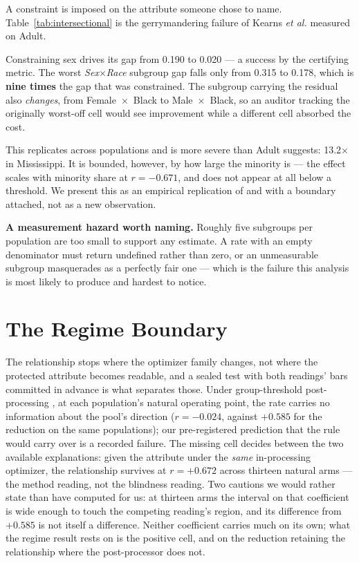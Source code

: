 \documentclass[conference]{IEEEtran}
\begin{document}
A constraint is imposed on the attribute someone chose to name.
Table~\ref{tab:intersectional} is the gerrymandering failure of Kearns \emph{et al.}
\cite{kearns2018} measured on Adult.

Constraining sex drives its gap from 0.190 to 0.020 --- a success by the certifying metric.
The worst \emph{Sex}$\times$\emph{Race} subgroup gap falls only from 0.315 to 0.178, which is
\textbf{nine times} the gap that was constrained. The subgroup carrying the residual also
\emph{changes}, from Female~$\times$~Black to Male~$\times$~Black, so an auditor tracking the
originally worst-off cell would see improvement while a different cell absorbed the cost.

This replicates across populations and is more severe than Adult suggests: 13.2$\times$ in
Mississippi. It is bounded, however, by how large the minority is --- the effect scales with
minority share at $r = -0.671$, and does not appear at all below a threshold. We present this
as an empirical replication of \cite{kearns2018} and \cite{maheshwari2023} with a boundary
attached, not as a new observation.

\textbf{A measurement hazard worth naming.} Roughly five subgroups per population are too small
to support any estimate. A rate with an empty denominator must return undefined rather than
zero, or an unmeasurable subgroup masquerades as a perfectly fair one --- which is the failure
this analysis is most likely to produce and hardest to notice.

\section{The Regime Boundary}
\label{sec:regime}

The relationship stops where the optimizer family changes, not where the protected attribute
becomes readable, and a sealed test with both readings' bars committed in advance is what
separates those. Under group-threshold post-processing \cite{hardt2016}, at each population's
natural operating point, the rate carries no information about the pool's direction
($r = -0.024$, against $+0.585$ for the reduction on the same populations); our pre-registered
prediction that the rule would carry over is a recorded failure. The missing cell decides
between the two available explanations: given the attribute under the \emph{same}
in-processing optimizer, the relationship survives at $r = +0.672$ across thirteen natural
arms --- the method reading, not the blindness reading. Two cautions we would rather state
than have computed for us: at thirteen arms the interval on that coefficient is wide enough to
touch the competing reading's region, and its difference from $+0.585$ is not itself a
difference. Neither coefficient carries much on its own; what the regime result rests on is the
positive cell, and on the reduction retaining the relationship where the post-processor does
not.
\end{document}
